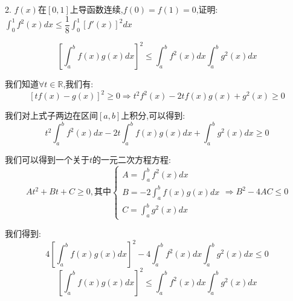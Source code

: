 2. $f(x)$在$[0,1]$上导函数连续,$f(0)=f(1)=0$,证明:  $\int_{0}^{1}f^{2}(x)dx\leq \dfrac{1}{8}\int_{0}^{1}[f'(x)]^2dx$
\begin{theorem}[积分形式柯西不等式]
	$$\left[ \int_{a}^{b}f(x)g(x)dx\right] ^2\leq \int_{a}^{b}f^2(x)dx\int_{a}^{b}g^{2}(x)dx$$
	
	我们知道$\forall t\in\mathbb{R}$,我们有:  
	$$\left[ tf(x)-g(x)\right]^2\geq 0\Rightarrow t^2f^{2}(x)-2tf(x)g(x)+g^{2}(x)\geq 0$$
	
	我们对上式子两边在区间$[a,b]$上积分,可以得到:  
	$$t^2\int_{a}^{b}f^{2}(x)dx-2t\int_{a}^{b}f(x)g(x)dx+\int_{a}^{b}g^{2}(x)dx\geq 0$$
	
	我们可以得到一个关于$t$的一元二次方程方程:  
	$$At^2+Bt+C\geq 0,\text{其中}\left\lbrace
	\begin{array}{l}
		A=\int_{a}^{b}f^{2}(x)dx\\
		B=-2\int_{a}^{b}f(x)g(x)dx\\
		C=\int_{a}^{b}g^{2}(x)dx
	\end{array}
	\right. \Rightarrow B^2-4AC\leq 0$$
	
	我们得到:  $$4\left[ \int_{a}^{b}f(x)g(x)dx\right]^2-4\int_{a}^{b}f^{2}(x)dx\int_{a}^{b}g^{2}(x)dx\leq 0 
	$$
	$$\left[ \int_{a}^{b}f(x)g(x)dx\right] ^2\leq \int_{a}^{b}f^2(x)dx\int_{a}^{b}g^{2}(x)dx$$
\end{theorem}
